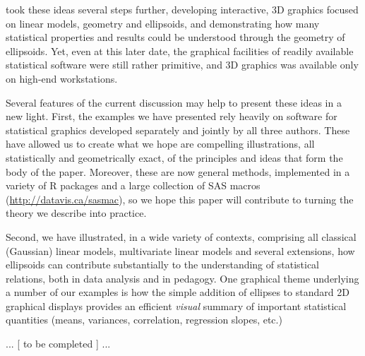 \citet{Monette:90}
took these ideas several steps further, developing interactive, 3D graphics focused on linear
models, geometry and ellipsoids, and demonstrating how many statistical properties
and results could be understood through the geometry of ellipsoids.  Yet, even at this
later date, the graphical facilities of readily available statistical software were still
rather primitive, and 3D graphics was available only on high-end workstations.
 

Several features of the current discussion may help to present these ideas in a
new light.  First, the examples we have presented rely heavily on software for 
statistical graphics developed separately and jointly by all three authors.
These have allowed us to create what we hope are compelling illustrations,
all statistically and geometrically exact, of the principles and ideas that
form the body of the paper.  Moreover, these are now general methods, implemented
in a variety of R packages
\citep{car,heplots1}
and a large collection of SAS macros (\url{http://datavis.ca/sasmac}),
so we hope this paper will contribute to turning the theory we describe
into practice.

Second, we have illustrated, in a wide variety of contexts,
comprising all classical (Gaussian) linear models, multivariate linear models
and several extensions,
how ellipsoids can contribute substantially to the understanding of statistical
relations, both in data analysis and in pedagogy.  One graphical theme underlying
a number of our examples is how the simple addition of ellipses to standard 2D graphical
displays provides an efficient \emph{visual} summary of important statistical quantities
(means, variances, correlation, regression slopes, etc.)

... [ to be completed ] ...




